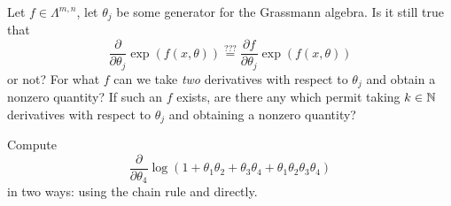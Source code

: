 \begin{exercise}
Let $f\in\Lambda^{m,n}$, let $\theta_{j}$ be some generator for the
Grassmann algebra. Is it still true that
\begin{equation}
  \frac{\partial}{\partial\theta_{j}}\exp\left(f(x,\theta)\right)
  \stackrel{???}{=} \frac{\partial f}{\partial\theta_{j}}\exp\left(f(x,\theta)\right)
\end{equation}
or not? For what $f$ can we take \emph{two} derivatives with respect to
$\theta_{j}$ and obtain a nonzero quantity? If such an $f$ exists, are
there any which permit taking $k\in\mathbb{N}$ derivatives with respect to
$\theta_{j}$ and obtaining a nonzero quantity?
\end{exercise}

\begin{exercise}[A.~Schwarz 2008]
  Compute
  \begin{equation}
\frac{\partial}{\partial\theta_{4}}\log(1 + \theta_{1}\theta_{2} + \theta_{3}\theta_{4}
+ \theta_{1}\theta_{2}\theta_{3}\theta_{4})
  \end{equation}
in two ways: using the chain rule and directly.
\end{exercise}
